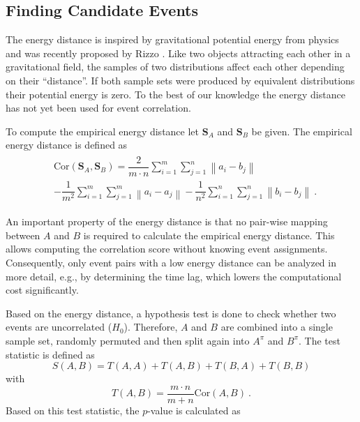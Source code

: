 \documentclass[conference]{IEEEtran}
\theoremstyle{examplestyle}
\begin{document}
\subsection{Finding Candidate Events}
\label{sec:energyDistance}
The energy distance is inspired by gravitational potential energy from physics and was recently proposed by Rizzo \cite{Rizzo2016}. Like two objects attracting each other in a gravitational field, the samples of two distributions affect each other depending on their ``distance''. If both sample sets were produced by equivalent distributions their potential energy is zero. To the best of our knowledge the energy distance has not yet been used for event correlation.

To compute the empirical energy distance let \(\pmb{S}_A\) and \(\pmb{S}_B\) be given. The empirical energy distance is defined as
\begin{align}
\begin{split}
	& \text{Cor}(\pmb{S}_A, \pmb{S}_B) = \dfrac{2}{m \cdot n} \sum_{i = 1}^m \sum_{j = 1}^n \left\| a_i - b_j \right\| \\
	& - \dfrac{1}{m^2} \sum_{i = 1}^m \sum_{j = 1}^m \left\| a_i - a_j \right\| - \dfrac{1}{n^2} \sum_{i = 1}^n \sum_{j = 1}^n \left\| b_i - b_j \right\| ~.
\end{split}
\end{align}

An important property of the energy distance is that no pair-wise mapping between \(A\) and \(B\) is required to calculate the empirical energy distance. This allows computing the correlation score without knowing event assignments. 
Consequently, only event pairs with a low energy distance can be analyzed in more detail, e.g., by determining the time lag, which lowers the computational cost significantly.

Based on the energy distance, a hypothesis test is done to check whether two events are uncorrelated (\(H_0\)). Therefore, \(A\) and \(B\) are combined into a single sample set, randomly permuted and then split again into \(A^\pi\) and \(B^\pi\). The test statistic is defined as
\begin{equation}
	S(A, B) = T(A, A) + T(A, B) + T(B, A) + T(B, B)
\end{equation}
with
\begin{equation*}
	T(A, B) = \dfrac{m \cdot n}{m + n} \text{Cor}(A, B) ~.
\end{equation*}
Based on this test statistic, the \(p\)-value is calculated as
\end{document}
